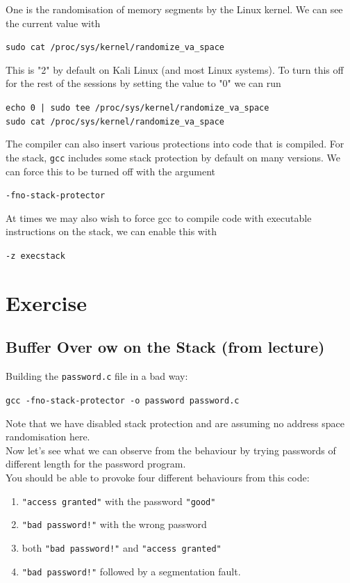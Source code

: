 \documentclass{article}
\begin{document}
\noindent One is the randomisation of memory segments by the Linux kernel. We
can see the current value with
\begin{center}
    \lstinline{sudo cat /proc/sys/kernel/randomize_va_space}
\end{center}
\noindent This is "2" by default on Kali Linux (and most Linux systems). To turn this off for the rest of the sessions by setting the value to "0" we can run
\begin{center}
    \lstinline{echo 0 | sudo tee /proc/sys/kernel/randomize_va_space}\\
    \lstinline{sudo cat /proc/sys/kernel/randomize_va_space}
\end{center}
\noindent The compiler can also insert various protections into code that is compiled.
For the stack, \lstinline{gcc} includes some stack protection by default on many
versions. We can force this to be turned off with the argument
\begin{center}
    \lstinline{-fno-stack-protector}
\end{center}
\noindent At times we may also wish to force gcc to compile code with executable
instructions on the stack, we can enable this with
\begin{center}
    \lstinline{-z execstack}
\end{center}

\section{Exercise}
\subsection{Buffer Over
ow on the Stack (from lecture)}
Building the \lstinline{password.c} file in a bad way:
\begin{center}
    \lstinline{gcc -fno-stack-protector -o password password.c}
\end{center}
\noindent Note that we have disabled stack protection and are assuming no address
space randomisation here.\\

\noindent Now let's see what we can observe from the behaviour by trying passwords
of different length for the password program.\\

\noindent You should be able to provoke four different behaviours from this code:
\begin{enumerate}
    \item \lstinline{"access granted"} with the password \lstinline{"good"}
    \item \lstinline{"bad password!"} with the wrong password
    \item both \lstinline{"bad password!"} and \lstinline{"access granted"}
    \item \lstinline{"bad password!"} followed by a segmentation fault.
\end{enumerate}
\end{document}
